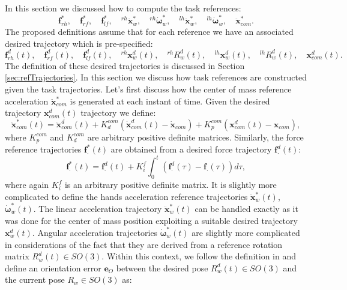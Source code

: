 \documentclass[12pt,a4paper,twoside]{article}
\begin{document}
In this section we discussed how to compute the task references:
$$
{\bm f}^*_{rh}, \quad {\bm f}^*_{rf},  \quad {\bm f}^*_{lf}, \quad ^{rh}{\ddot {\bm x}}^*_w, \quad {}^{rh}{\dot {\bm \omega}}_w^* , \quad ^{lh}{\ddot {\bm x}}^*_w, \quad {}^{lh}{\dot {\bm \omega}}_w^*, \quad \ddot {\bm x}^*_{com}.
$$
The proposed definitions assume that for each reference we have an associated desired trajectory which is pre-specified: 
$$
{\bm f}^d_{rh} (t), \quad {\bm f}^d_{rf}(t),  \quad {\bm f}^d_{lf}(t), \quad ^{rh}{ {\bm x}}^d_w(t), \quad {}^{rh}{ {R}}_w^d(t) , \quad ^{lh}{ {\bm x}}^d_w(t), \quad {}^{lh}{ {R}}_w^d(t), \quad  {\bm x}^d_{com}(t).
$$
The definition of these desired trajectories is discussed in Section \ref{sec:refTrajectories}. In this section we discuss how task references are constructed given the task trajectories. Let's first discuss how the center of mass reference acceleration $\ddot {\bm x}_{com}^*$ is generated at each instant of time. Given the desired trajectory ${\bm x}_{com}^d (t)$ trajectory we define:
\begin{equation} \label{eq:accRef}
\ddot {\bm x}_{com}^* (t) = \ddot {\bm x}_{com}^d (t) + K_d^{com} \left( \dot {\bm x}_{com}^d (t) - \dot {\bm x}_{com}\right) + K_p^{com} \left( {\bm x}_{com}^d (t) - {\bm x}_{com}\right),
\end{equation}
where $K_p^{com}$ and $K_d^{com}$ are arbitrary positive definite matrices. Similarly, the force reference trajectories ${\bm f}^*_{\cdot} (t)$ are obtained from a desired force trajectory ${\bm f}^d_{\cdot} (t)$:
\begin{equation} \label{eq:fRef}
{\bm f}_{\cdot}^* (t) = {\bm f}_{\cdot}^d (t) + K_i^f \int_0^t \left( {\bm f}_{\cdot}^d (\tau) - {\bm f}_{\cdot} (\tau) \right) d \tau,
\end{equation}
where again $K_i^f$ is an arbitrary positive definite matrix. It is slightly more complicated to define the hands acceleration reference trajectories  ${\ddot {\bm x}}^*_w(t)$, ${\dot {\bm \omega}}_w^* (t)$. The linear acceleration trajectory ${\ddot {\bm x}}^*_w(t)$ can be handled exactly as it was done for the center of mass position exploiting a suitable desired trajectory ${{\bm x}}^d_w(t)$. Angular acceleration trajectories ${\dot {\bm \omega}}_w^* (t)$ are slightly more complicated in considerations of the fact that they are derived from a reference rotation matrix $R^d_w(t) \in SO(3)$. Within this context, we follow the definition in \cite{siciliano2009} and define an orientation error $\bm e_O$ between the desired pose $R^d_w(t) \in SO(3)$ and the current pose $R_w \in SO(3)$ as:
\end{document}
